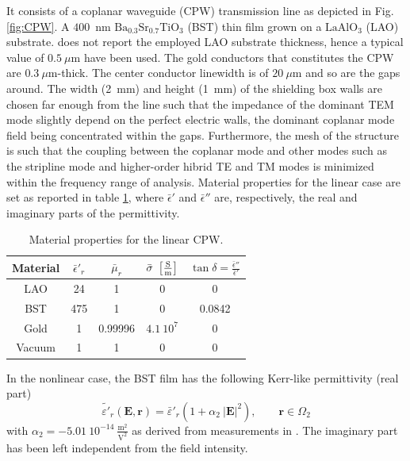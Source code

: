 It consists of a coplanar waveguide (CPW) transmission line as depicted in Fig. \ref{fig:CPW}. A $400$~nm $\text{Ba}_{0.3}\text{Sr}_{0.7}\text{TiO}_{3}$ (BST) thin film grown on a $\text{LaAlO}_3$ (LAO) substrate. \cite{mateu2006measurements} does not report the employed LAO substrate thickness, hence a typical value of $0.5~{\mu}$m \cite{gim2000microstructure} have been used. The gold conductors that constitutes the CPW are $0.3~{\mu}$m-thick. The center conductor linewidth is of $20~{\mu}$m and so are the gaps around. The width (2~mm) and height (1~mm) of the shielding box walls are chosen far enough from the line such that the impedance of the dominant TEM mode slightly depend on the perfect electric walls, the dominant coplanar mode field being concentrated within the gaps. Furthermore, the mesh of the structure is such that the coupling between the coplanar mode and other modes such as the stripline mode and higher-order hibrid TE and TM modes is minimized within the frequency range of analysis. 
Material properties for the linear case are set as reported in table \ref{tab:CPWmat}, where $\bar{\epsilon}'$ and $\bar{\epsilon}''$ are, respectively, the real and imaginary parts of the permittivity.

\begin{table}[h!]
\begin{center}
\begin{tabular}{|c|c|c|c|c|} \hline
Material & ${\bar{\epsilon}'}_r$ & $\bar{\mu}_r$ & $\bar{\sigma}~\left[\frac{\mathrm{S}}{\mathrm{m}}\right]$ & $\tan \delta = \frac{\bar{\epsilon}''}{\bar{\epsilon}'}$ \\ \hline \hline
LAO & 24 & 1 & 0 & 0 \\ \hline
BST & 475 & 1 & 0 & 0.0842 \\ \hline
Gold & 1 & 0.99996 & $4.1~10^7$ & 0 \\ \hline
Vacuum & 1 & 1 & 0 & 0 \\ \hline
\end{tabular}
\end{center}
\caption{Material properties for the linear CPW.}
\label{tab:CPWmat}
\end{table} 

In the nonlinear case, the BST film has the following Kerr-like permittivity (real part)
\begin{equation}
\tilde{{\varepsilon}'}_r(\mathbf{E}, \mathbf{r}) = {\bar{\varepsilon}'}_r \left( 1 + 
\alpha_2 \ |\mathbf{E}|^2 \right), \qquad \mathbf{r} \in \Omega_2
\end{equation}
\noindent with $\alpha_2 = - 5.01~10^{-14}~\frac{\mathrm{m}^2}{\mathrm{V}^2}$ as derived from measurements in \cite{mateu2006measurements}. The imaginary part has been left independent from the field intensity.

